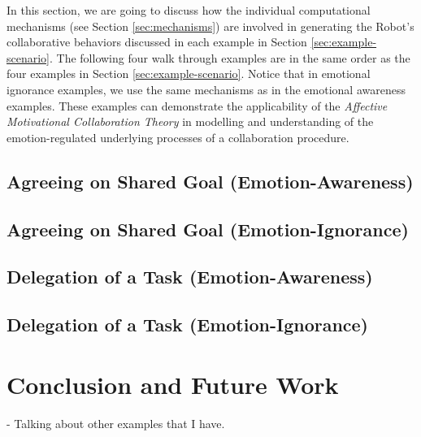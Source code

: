 In this section, we are going to discuss how the individual computational
mechanisms (see Section \ref{sec:mechanisms}) are involved in generating the
Robot's collaborative behaviors discussed in each example in Section
\ref{sec:example-scenario}. The following four walk through examples are in the
same order as the four examples in Section \ref{sec:example-scenario}. Notice
that in emotional ignorance examples, we use the same mechanisms as in the
emotional awareness examples. These examples can demonstrate the
applicability of the \textit{Affective Motivational Collaboration Theory} in
modelling and understanding of the emotion-regulated underlying processes of a
collaboration procedure.

\subsection{Agreeing on Shared Goal (Emotion-Awareness)}
\label{sec:wt-exp1}

\subsection{Agreeing on Shared Goal (Emotion-Ignorance)}
\label{sec:wt-exp2}

\subsection{Delegation of a Task (Emotion-Awareness)}
\label{sec:wt-exp3}

\subsection{Delegation of a Task (Emotion-Ignorance)}
\label{sec:wt-exp4}

\section{Conclusion and Future Work}

- Talking about other examples that I have.




%
%



